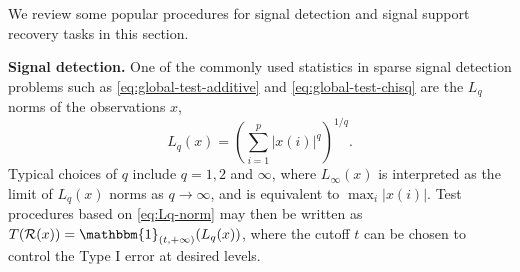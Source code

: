 
We review some popular procedures for signal detection and signal support recovery tasks in this section.

{\bf Signal detection.}
One of the commonly used statistics in sparse signal detection problems such as \eqref{eq:global-test-additive} and \eqref{eq:global-test-chisq} are the $L_q$ norms of the observations $x$,
\begin{equation} \label{eq:Lq-norm}
   L_q(x) = \left(\sum_{i=1}^p{|x(i)|^q}\right)^{1/q}.
\end{equation}
Typical choices of $q$ include $q=1, 2$ and $\infty$, where $L_\infty(x)$ is interpreted as the limit of $L_q(x)$ norms as $q\to\infty$, and is equivalent to $\max_{i}|x(i)|$.
Test procedures based on \eqref{eq:Lq-norm} may then be written as $T(\mathcal{R}(x)) = \mathbbm{1}_{(t,+\infty)}(L_q(x))$, where the cutoff $t$ can be chosen to control the Type I error at desired levels.


